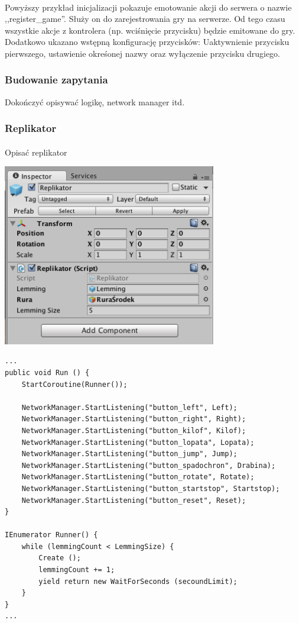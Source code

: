 \paragraph{}
Powyższy przykład inicjalizacji pokazuje emotowanie akcji do serwera o nazwie ,,register\_game''. Służy on do zarejestrowania gry na serwerze. Od tego czasu wszystkie akcje z kontrolera (np. wciśnięcie przycisku) będzie emitowane do gry.
Dodatkowo ukazano wstępną konfigurację przycisków: Uaktywnienie przycisku pierwszego, ustawienie okreśonej nazwy oraz wyłączenie przycisku drugiego.

\subsubsection{Budowanie zapytania}


{\color{red}Dokończyć opisywać logikę, network manager itd}.

\subsubsection{Replikator}
\paragraph{}
{\color{red}Opisać replikator}
\begin{center}
\includegraphics[width=0.7\textwidth]{images/replikator.png}
\end{center}

\begin{lstlisting}[language=CSharp]
...
public void Run () {
	StartCoroutine(Runner());

	NetworkManager.StartListening("button_left", Left);
	NetworkManager.StartListening("button_right", Right);
	NetworkManager.StartListening("button_kilof", Kilof);
	NetworkManager.StartListening("button_lopata", Lopata);
	NetworkManager.StartListening("button_jump", Jump);
	NetworkManager.StartListening("button_spadochron", Drabina);
	NetworkManager.StartListening("button_rotate", Rotate);
	NetworkManager.StartListening("button_startstop", Startstop);
	NetworkManager.StartListening("button_reset", Reset);
}

IEnumerator Runner() {
	while (lemmingCount < LemmingSize) {
		Create ();
		lemmingCount += 1;
		yield return new WaitForSeconds (secoundLimit);
	}
}
...
\end{lstlisting}

